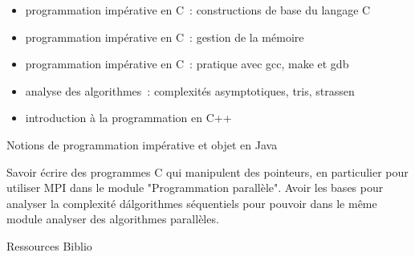





{
\begin{itemize} 
  \item programmation impérative en C : constructions de base du langage C
  \item programmation impérative en C : gestion de la mémoire
  \item programmation impérative en C : pratique avec gcc, make et gdb
  \item analyse des algorithmes : complexités asymptotiques, tris, strassen
  \item introduction à la programmation en C++ 
\end{itemize} 
} 
{Notions de programmation impérative et objet en Java} 
{\begin{itemize}
\ObjItem Savoir écrire des programmes C qui manipulent des pointeurs, en particulier pour utiliser MPI dans le module "Programmation parallèle".
\ObjItem Avoir les bases pour analyser la complexité d\'algorithmes séquentiels pour pouvoir dans le même module analyser des algorithmes parallèles.
\end{itemize}
} 
{Ressources} 
{Biblio} 
 
\vfill


